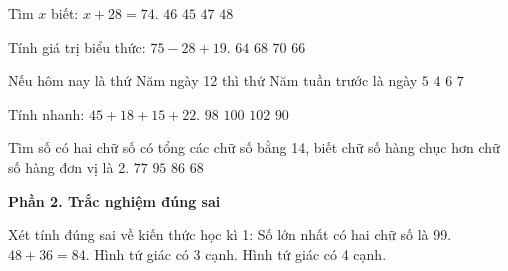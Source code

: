 \begin{ex} %
Tìm $x$ biết: $x + 28 = 74$.
\choice
{\True $46$}
{$45$}
{$47$}
{$48$}
\end{ex}

\begin{ex} %
Tính giá trị biểu thức: $75 - 28 + 19$.
\choice
{$64$}
{$68$}
{$70$}
{\True $66$}
\end{ex}

\begin{ex} %
Nếu hôm nay là thứ Năm ngày 12 thì thứ Năm tuần trước là ngày
\choice
{\True $5$}
{$4$}
{$6$}
{$7$}
\end{ex}

\begin{ex} %
Tính nhanh: $45 + 18 + 15 + 22$.
\choice
{$98$}
{\True $100$}
{$102$}
{$90$}
\end{ex}

\begin{ex} %
Tìm số có hai chữ số có tổng các chữ số bằng 14, biết chữ số hàng chục hơn chữ số hàng đơn vị là 2.
\choice
{$77$}
{$95$}
{\True $86$}
{$68$}
\end{ex}

\textbf{Phần 2. Trắc nghiệm đúng sai}

\begin{ex} %
Xét tính đúng sai về kiến thức học kì 1:
\choiceTF
{\True Số lớn nhất có hai chữ số là 99.}
{\True $48 + 36 = 84$.}
{Hình tứ giác có 3 cạnh.}
{\True Hình tứ giác có 4 cạnh.}
\end{ex}

